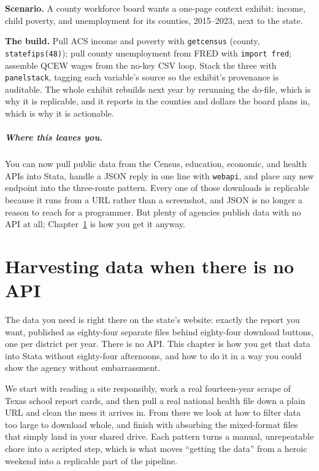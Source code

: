 \documentclass[
    a4paper,
    fontsize=10pt,
    twoside=true,
    numbers=noenddot,
]{kaobook}
\newcounter{appliedexample}
\newenvironment{appliedexample}[1][]{%
    \refstepcounter{appliedexample}%
    \begin{appliedexamplebox}[frametitle={Applied Example~\theappliedexample.~~#1}]%
}{%
    \end{appliedexamplebox}%
}
\begin{document}
\begin{appliedexample}[A Texas county panel from three APIs]
\textbf{Scenario.} A county workforce board wants a one-page context exhibit: income, child poverty, and unemployment for its counties, 2015--2023, next to the state.

\medskip
\textbf{The build.} Pull ACS income and poverty with \texttt{getcensus} (county, \texttt{statefips(48)}); pull county unemployment from FRED with \texttt{import fred}; assemble QCEW wages from the no-key CSV loop. Stack the three with \texttt{panelstack}, tagging each variable's source so the exhibit's provenance is auditable. The whole exhibit rebuilds next year by rerunning the do-file, which is why it is replicable, and it reports in the counties and dollars the board plans in, which is why it is actionable.
\end{appliedexample}

\paragraph{Where this leaves you.} You can now pull public data from the Census, education, economic, and health APIs into Stata, handle a JSON reply in one line with \texttt{webapi}, and place any new endpoint into the three-route pattern. Every one of those downloads is replicable because it runs from a URL rather than a screenshot, and JSON is no longer a reason to reach for a programmer. But plenty of agencies publish data with no API at all; Chapter~\ref{ch:noapi} is how you get it anyway.

\chapter{Harvesting data when there is no API}\label{ch:noapi}

The data you need is right there on the state's website: exactly the report you want, published as eighty-four separate files behind eighty-four download buttons, one per district per year. There is no API. This chapter is how you get that data into Stata without eighty-four afternoons, and how to do it in a way you could show the agency without embarrassment.

We start with reading a site responsibly, work a real fourteen-year scrape of Texas school report cards, and then pull a real national health file down a plain URL and clean the mess it arrives in. From there we look at how to filter data too large to download whole, and finish with absorbing the mixed-format files that simply land in your shared drive. Each pattern turns a manual, unrepeatable chore into a scripted step, which is what moves \enquote{getting the data} from a heroic weekend into a replicable part of the pipeline.
\end{document}
